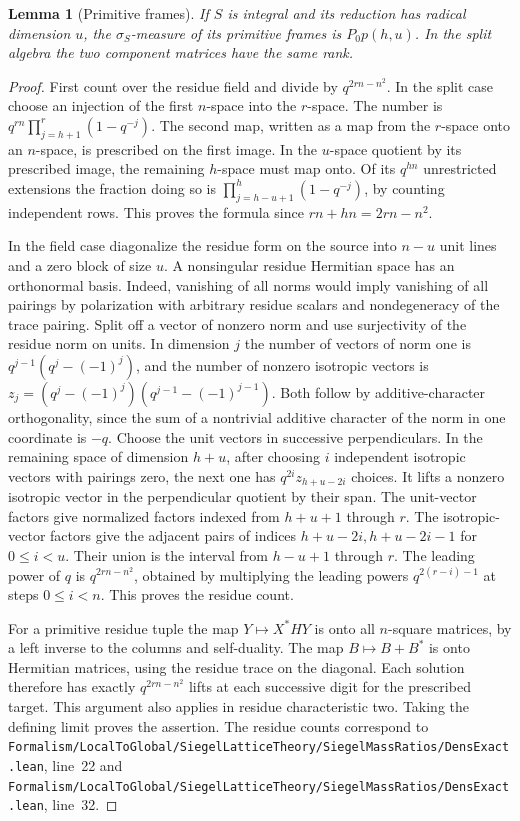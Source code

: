 \documentclass[a4paper,11pt]{article}
\newtheorem{lemma}[proposition]{Lemma}
\theoremstyle{definition}
\theoremstyle{remark}
\newcommand{\srcloc}[2]{{\small\nolinkurl{#1.lean}}, line~#2}
\numberwithin{equation}{section}
\begin{document}
\begin{lemma}[Primitive frames]\label{lem:primitive215}
If \(S\) is integral and its reduction has radical dimension \(u\),
the \(\sigma_S\)-measure of its primitive frames is \(P_0p(h,u)\).
In the split algebra the two component matrices have the same rank.
\end{lemma}
\begin{proof}
First count over the residue field and divide by \(q^{2rn-n^2}\).
In the split case choose an injection of the first \(n\)-space
into the \(r\)-space. The number is
\(q^{rn}\prod_{j=h+1}^r(1-q^{-j})\). The second map, written
as a map from the \(r\)-space onto an \(n\)-space, is prescribed
on the first image. In the \(u\)-space quotient by its prescribed
image, the remaining \(h\)-space must map onto. Of its
\(q^{hn}\) unrestricted extensions the fraction doing so is
\(\prod_{j=h-u+1}^h(1-q^{-j})\), by counting independent rows.
This proves the formula since \(rn+hn=2rn-n^2\).

In the field case diagonalize the residue form on the source
into \(n-u\) unit lines and a zero block of size \(u\). A
nonsingular residue Hermitian space has an orthonormal basis.
Indeed, vanishing of all norms would imply vanishing of all
pairings by polarization with arbitrary residue scalars and
nondegeneracy of the trace pairing. Split off a vector of
nonzero norm and use surjectivity of the residue norm on units.
In dimension \(j\) the number of vectors of norm one is
\(q^{j-1}(q^j-(-1)^j)\), and the number of nonzero isotropic
vectors is
\(z_j=(q^j-(-1)^j)(q^{j-1}-(-1)^{j-1})\).
Both follow by additive-character orthogonality, since the sum
of a nontrivial additive character of the norm in one coordinate
is \(-q\). Choose the unit vectors in successive perpendiculars.
In the remaining space of dimension \(h+u\), after choosing
\(i\) independent isotropic vectors with pairings zero, the next
one has \(q^{2i}z_{h+u-2i}\) choices. It lifts a nonzero
isotropic vector in the perpendicular quotient by their span.
The unit-vector factors give normalized factors indexed from
\(h+u+1\) through \(r\). The isotropic-vector factors give the
adjacent pairs of indices \(h+u-2i,h+u-2i-1\) for \(0\le i<u\).
Their union is the interval from \(h-u+1\) through \(r\).
The leading power of \(q\) is \(q^{2rn-n^2}\), obtained by
multiplying the leading powers \(q^{2(r-i)-1}\) at steps
\(0\le i<n\). This proves the residue count.

For a primitive residue tuple the map \(Y\mapsto X^*HY\)
is onto all \(n\)-square matrices, by a left inverse to the
columns and self-duality. The map \(B\mapsto B+B^*\) is onto
Hermitian matrices, using the residue trace on the diagonal.
Each solution therefore has exactly \(q^{2rn-n^2}\) lifts at
each successive digit for the prescribed target. This argument
also applies in residue characteristic two. Taking the defining
limit proves the assertion. The residue counts correspond to
\srcloc{Formalism/LocalToGlobal/SiegelLatticeTheory/SiegelMassRatios/DensExact}{22}
and \srcloc{Formalism/LocalToGlobal/SiegelLatticeTheory/SiegelMassRatios/DensExact}{32}.
\end{proof}
\end{document}
